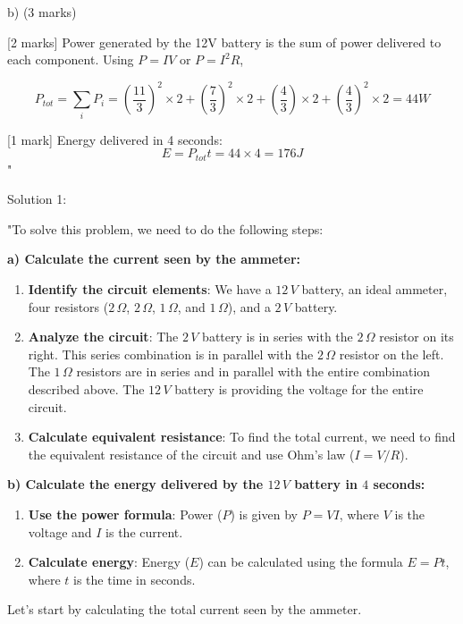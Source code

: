 b)  (3 marks)

[2 marks] Power generated by the 12V battery is the sum of power delivered to each component. Using \( P = IV \) or \( P = I^2 R \),

\[ P_{tot} = \sum_{i} P_i = \left ( \frac{11}{3} \right )^2 \times 2 + \left ( \frac{7}{3} \right )^2 \times 2 + \left ( \frac{4}{3} \right ) \times 2 + \left ( \frac{4}{3} \right )^2 \times 2 = 44 W \]

[1 mark] Energy delivered in 4 seconds: 
\[ E = P_{tot} t = 44 \times 4 = 176 J \]
"

Solution 1:

"To solve this problem, we need to do the following steps:

\textbf{a) Calculate the current seen by the ammeter:}

\begin{enumerate}
  \item \textbf{Identify the circuit elements}: We have a \(12\,V\) battery, an ideal ammeter, four resistors (\(2\,\Omega\), \(2\,\Omega\), \(1\,\Omega\), and \(1\,\Omega\)), and a \(2\,V\) battery.
  \item \textbf{Analyze the circuit}: The \(2\,V\) battery is in series with the \(2\,\Omega\) resistor on its right. This series combination is in parallel with the \(2\,\Omega\) resistor on the left. The \(1\,\Omega\) resistors are in series and in parallel with the entire combination described above. The \(12\,V\) battery is providing the voltage for the entire circuit.
  \item \textbf{Calculate equivalent resistance}: To find the total current, we need to find the equivalent resistance of the circuit and use Ohm's law (\(I = V/R\)).
\end{enumerate}

\textbf{b) Calculate the energy delivered by the \(12\,V\) battery in \(4\) seconds:}

\begin{enumerate}
  \item \textbf{Use the power formula}: Power (\(P\)) is given by \(P = VI\), where \(V\) is the voltage and \(I\) is the current.
  \item \textbf{Calculate energy}: Energy (\(E\)) can be calculated using the formula \(E = Pt\), where \(t\) is the time in seconds.
\end{enumerate}

Let's start by calculating the total current seen by the ammeter.

